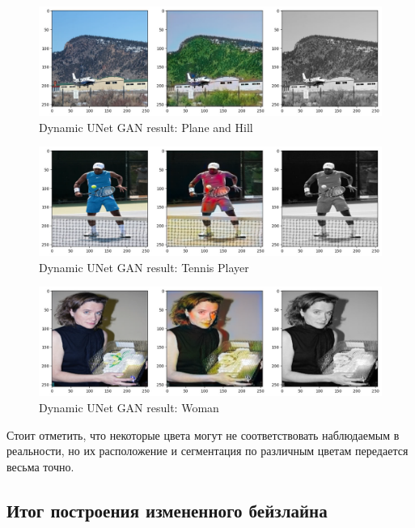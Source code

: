\documentclass[14pt]{article}
\begin{document}
\begin{figure}[H]
    \centering
    \includegraphics[width=1.0\textwidth]{resources/dynamic_unet_gan_results/plane_and_hill.png}
    \caption{Dynamic UNet GAN result: Plane and Hill}
    \label{fig:plane_hill}
\end{figure}

\begin{figure}[H]
    \centering
    \includegraphics[width=1.0\textwidth]{resources/dynamic_unet_gan_results/tennis_player.png}
    \caption{Dynamic UNet GAN result: Tennis Player}
    \label{fig:tennis_player}
\end{figure}

\begin{figure}[H]
    \centering
    \includegraphics[width=1.0\textwidth]{resources/dynamic_unet_gan_results/woman.png}
    \caption{Dynamic UNet GAN result: Woman}
    \label{fig:woman}
\end{figure}

Стоит отметить, что некоторые цвета могут не соответствовать наблюдаемым в реальности,
но их расположение и сегментация по различным цветам передается весьма точно.

\subsection{Итог построения измененного бейзлайна}
\end{document}
